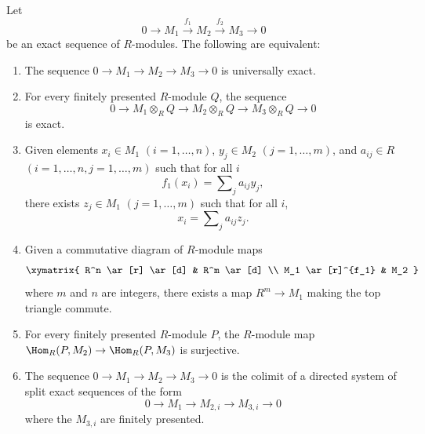%
\begin{theorem}
\label{theorem-universally-exact-criteria}
Let
$$
0 \to M_1 \xrightarrow{f_1} M_2 \xrightarrow{f_2} M_3 \to 0
$$
be an exact sequence of $R$-modules.  The following are equivalent:
\begin{enumerate}
\item The sequence $0 \to M_1 \to M_2 \to M_3
\to 0$ is universally exact.
\item For every finitely presented $R$-module $Q$, the sequence
$$
0 \to M_1 \otimes_R Q \to M_2 \otimes_R Q \to
M_3 \otimes_R Q \to 0
$$
is exact.
\item Given elements $x_i \in M_1$ $(i = 1, \ldots, n)$, $y_j \in M_2$ $(j = 1,
\ldots, m)$, and $a_{ij} \in R$ $(i = 1, \ldots, n, j = 1, \ldots, m)$ such that
for all $i$
$$
f_1(x_i) = \sum\nolimits_j a_{ij} y_j,
$$
there exists $z_j \in M_1$ $(j =1, \ldots, m)$ such that for all $i$,
$$
x_i = \sum\nolimits_j a_{ij} z_j .
$$
\item Given a commutative diagram of $R$-module maps
$$
\xymatrix{
R^n \ar[r] \ar[d] &  R^m \ar[d] \\
M_1 \ar[r]^{f_1}        &  M_2
}
$$
where $m$ and $n$ are integers, there exists a map $R^m \to M_1$ making
the top triangle commute.
\item For every finitely presented $R$-module $P$, the $R$-module
map $\Hom_R(P, M_2) \to \Hom_R(P, M_3)$ is surjective.
\item The sequence $0 \to M_1 \to M_2 \to M_3
\to 0$ is the colimit of a directed system of split exact sequences of
the form
$$
0 \to M_{1} \to M_{2, i} \to M_{3, i} \to 0
$$
where the $M_{3, i}$ are finitely presented.
\end{enumerate}
\end{theorem}

